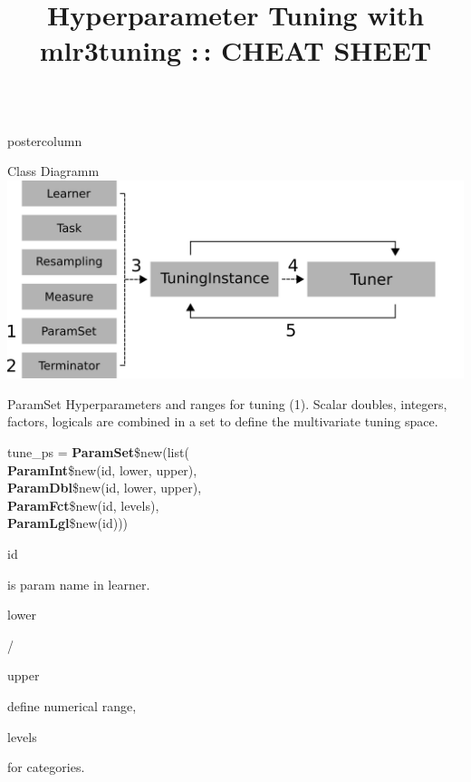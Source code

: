 \documentclass{beamer}
\title{Hyperparameter Tuning with mlr3tuning :\,: CHEAT SHEET} %
\newlength{\columnheight} %
\newcommand{\codeinline}[1]{\begin{codeboxinline}#1\end{codeboxinline}}
\begin{document}
\begin{frame}[fragile]{}
	\begin{columns}
		\begin{column}{.245\textwidth}
			\begin{beamercolorbox}[center]{postercolumn}
				\begin{minipage}{.98\textwidth}
					\parbox[t][\columnheight]{\textwidth}{
						\begin{myblock}{Class Diagramm}
                            \includegraphics[width=\textwidth]{img/tuning_objects.png}
						\end{myblock}
						\begin{myblock}{ParamSet}
					        Hyperparameters and ranges for tuning (1). 
					        Scalar doubles, integers, factors, logicals are combined 
					        in a set to define the multivariate tuning space.
							\\
							\begin{codeboxmultiline}[width=20.75cm]
								tune\_ps = \textbf{ParamSet}\$new(list(\\
								\hspace*{1ex}\textbf{ParamInt}\$new(id, lower, upper),\\
								\hspace*{1ex}\textbf{ParamDbl}\$new(id, lower, upper),\\
								\hspace*{1ex}\textbf{ParamFct}\$new(id, levels),\\
								\hspace*{1ex}\textbf{ParamLgl}\$new(id)))
							\end{codeboxmultiline}
                            \codeinline{id} is param name in learner. 
                            \codeinline{lower}/\codeinline{upper} define 
                            numerical range, \codeinline{levels} for categories.
                            \vspace{1em}
                            \\ 

\end{myblock}}
\end{minipage}
\end{beamercolorbox}
\end{column}
\end{columns}
\end{frame}
\end{document}
